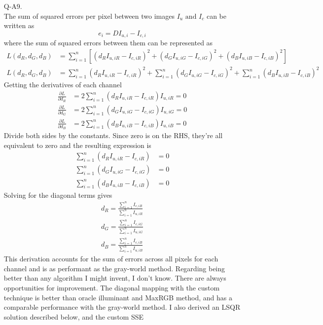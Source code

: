 \documentclass[12pt]{report}
\begin{document}
\begin{enumerate}
    \FloatBarrier 

    \item[Q-A9.]
    \ \\
    The sum of squared errors per pixel between two images $I_u \text{ and } I_c$ can be written as 
    \[
    e_i = DI_{u,i} - I_{c,i}
    \]
    where the sum of squared errors between them can be represented as
    \begin{align*}
    L(d_R,d_G,d_B) &= \sum_{i=1}^n \left[(d_R I_{u,iR} - I_{c,iR})^2 + (d_G I_{u,iG} - I_{c,iG})^2 + (d_B I_{u,iB} - I_{c,iB})^2 \right]  \\
    L(d_R,d_G,d_B) &= \sum_{i=1}^n (d_R I_{u,iR} - I_{c,iR})^2 + \sum_{i=1}^n (d_G I_{u,iG} - I_{c,iG})^2 + \sum_{i=1}^n (d_B I_{u,iB} - I_{c,iB})^2
    \end{align*}
    Getting the derivatives of each channel
    \begin{align*}
    \frac{\partial L}{\partial d_R} &= 2 \sum_{i=1}^n (d_R I_{u,iR} - I_{c,iR}) I_{u,iR} = 0 \\
    \frac{\partial L}{\partial d_G} &= 2 \sum_{i=1}^n (d_G I_{u,iG} - I_{c,iG}) I_{u,iG} = 0 \\
    \frac{\partial L}{\partial d_B} &= 2 \sum_{i=1}^n (d_B I_{u,iB} - I_{c,iB}) I_{u,iB} = 0
    \end{align*}
    Divide both sides by the constants. Since zero is on the RHS, they're all equivalent to zero and the resulting expression is 
    \begin{align*}
    \sum_{i=1}^n (d_R I_{u,iR} - I_{c,iR}) &= 0 \\
    \sum_{i=1}^n (d_G I_{u,iG} - I_{c,iG}) &= 0 \\
    \sum_{i=1}^n (d_B I_{u,iB} - I_{c,iB}) &= 0
    \end{align*}
    Solving for the diagonal terms gives 
    \begin{align*}
    d_R = \frac{\sum_{i=1}^n I_{c,iR}}{\sum_{i=1}^n I_{u,iR}} \\
    d_G = \frac{\sum_{i=1}^n I_{c,iG}}{\sum_{i=1}^n I_{u,iG}} \\
    d_B = \frac{\sum_{i=1}^n I_{c,iB}}{\sum_{i=1}^n I_{u,iB}} 
    \end{align*}
    This derivation accounts for the sum of errors across all pixels for each channel and is as performant as the gray-world method. Regarding being better than any 
    algorithm I might invent, I don't know. There are always opportunities for improvement. The diagonal mapping with the custom technique is better than oracle 
    illuminant and MaxRGB method, and has a comparable performance with the gray-world method. I also derived an LSQR solution described below, and the custom SSE 

\end{enumerate}
\end{document}
